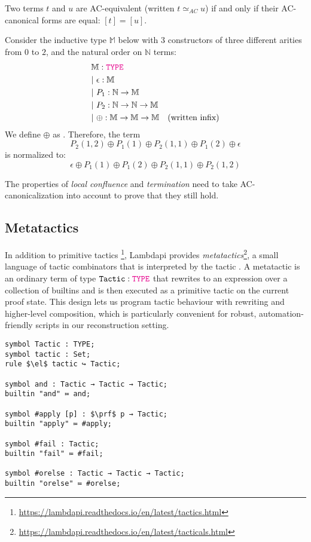 \begin{definition}[AC equivalence]
Two terms $t$ and $u$ are AC-equivalent (written $t \simeq_{AC} u$) if and only if their AC-canonical forms are equal: $[t] = [u]$.
\end{definition}

\begin{example}
Consider the inductive type $\mathbb{M}$ below with 3 constructors of three different arities from $0$ to $2$, and the natural order on $\mathbb{N}$ terms:
\begin{align*}
&\bb{M}: \type \\
&|~\epsilon : \bb{M} \\
&|~P_1: \N \ra \bb{M} \\
&|~P_2 : \N \ra \N \ra \bb{M} \\
&|~ \oplus : \bb{M} \to \bb{M} \to \bb{M} \quad \text{(written infix)}
\end{align*}
We define $\oplus$ as . Therefore, the term
\[
  P_2(1,2) \oplus P_1(1) \oplus P_2(1,1) \oplus P_1(2) \oplus \epsilon
\]
is normalized to:
\[
  \epsilon \oplus P_1(1) \oplus P_1(2) \oplus P_2(1,1) \oplus P_2(1,2)
\]
\end{example}

\begin{remark}
The properties of \emph{local confluence} and \emph{termination} need to take AC-canonicalization into account to prove that they still hold.
\end{remark}

\subsection{Metatactics}
\label{sec:metatactic}

In addition to primitive tactics \footnote{\url{https://lambdapi.readthedocs.io/en/latest/tactics.html}}, Lambdapi provides \emph{metatactics}\footnote{\url{https://lambdapi.readthedocs.io/en/latest/tacticals.html}}, a small language of tactic combinators that is interpreted by the tactic \eval.
A metatactic is an ordinary term of type $\kw{Tactic}: \type$ that rewrites to an expression over a collection of builtins and is then executed as a primitive tactic on the current proof state.
This design lets us program tactic behaviour with rewriting and higher-level composition, which is particularly convenient for robust, automation-friendly scripts in our reconstruction setting.

\begin{lstlisting}[language=Lambdapi,caption={Example of builtins metatactics},label={lst:meta-builtins}, mathescape=true]
symbol Tactic : TYPE;
symbol tactic : Set;
rule $\el$ tactic ↪ Tactic;

symbol and : Tactic → Tactic → Tactic;
builtin "and" ≔ and;

symbol #apply [p] : $\prf$ p → Tactic;
builtin "apply" ≔ #apply;

symbol #fail : Tactic;
builtin "fail" ≔ #fail;

symbol #orelse : Tactic → Tactic → Tactic;
builtin "orelse" ≔ #orelse;
\end{lstlisting}

